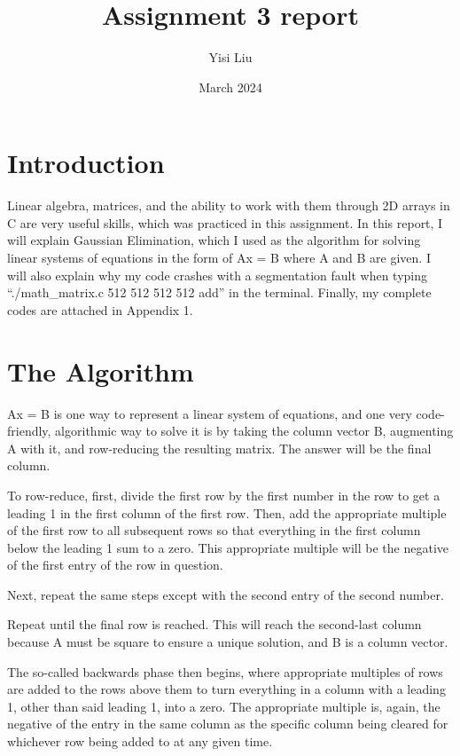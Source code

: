 \documentclass{article}
\title{Assignment 3 report}
\author{Yisi Liu}
\date{March 2024}
\begin{document}
\maketitle

\section{Introduction}

Linear algebra, matrices, and the ability to work with them through 2D arrays in C are very useful skills, which was practiced in this assignment. In this report, I will explain Gaussian Elimination, which I used as the algorithm for solving linear systems of equations in the form of Ax = B where A and B are given. I will also explain why my code crashes with a segmentation fault when typing ``./math\_matrix.c 512 512 512 512 add'' in the terminal. Finally, my complete codes are attached in Appendix 1. 

\section{The Algorithm}

Ax = B is one way to represent a linear system of equations, and one very code-friendly, algorithmic way to solve it is by taking the column vector B, augmenting A with it, and row-reducing the resulting matrix. The answer will be the final column. 

To row-reduce, first, divide the first row by the first number in the row to get a leading 1 in the first column of the first row. Then, add the appropriate multiple of the first row to all subsequent rows so that everything in the first column below the leading 1 sum to a zero. This appropriate multiple will be the negative of the first entry of the row in question. 

Next, repeat the same steps except with the second entry of the second number. 

Repeat until the final row is reached. This will reach the second-last column because A must be square to ensure a unique solution, and B is a column vector. 

The so-called backwards phase then begins, where appropriate multiples of rows are added to the rows above them to turn everything in a column with a leading 1, other than said leading 1, into a zero. The appropriate multiple is, again, the negative of the entry in the same column as the specific column being cleared for whichever row being added to at any given time. 
\end{document}
